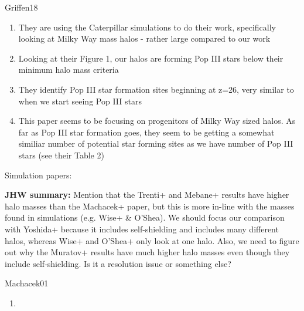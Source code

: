 \documentclass[a4paper,fleqn,usenatbib]{mnras}
\begin{document}
\li Griffen18
\begin{enumerate}
	\item They are using the Caterpillar simulations to do their work, specifically looking at Milky Way mass halos - rather large compared to our work
	\item Looking at their Figure 1, our halos are forming Pop III stars below their minimum halo mass criteria
	\item They identify Pop III star formation sites beginning at z=26, very similar to when we start seeing Pop III stars
	\item This paper seems to be focusing on progenitors of Milky Way sized halos. As far as Pop III star formation goes, they seem to be getting a somewhat similiar number of potential star forming sites as we have number of Pop III stars (see their Table 2)
\end{enumerate}

\li Simulation papers: \citep{Machacek01, Yoshida03, Wise07_UVB,
  OShea08, Muratov13}

\noindent\textbf{JHW summary:} Mention that the Trenti+ and Mebane+ results have higher halo masses than the Machacek+ paper, but this is more in-line with the masses found in simulations (e.g. Wise+ \& O'Shea).  We should focus our comparison with Yoshida+ because it includes self-shielding and includes many different halos, whereas Wise+ and O'Shea+ only look at one halo.  Also, we need to figure out why the Muratov+ results have much higher halo masses even though they include self-shielding.  Is it a resolution issue or something else?

\li Machacek01
\begin{enumerate}
	\item
\end{enumerate}
\end{document}
